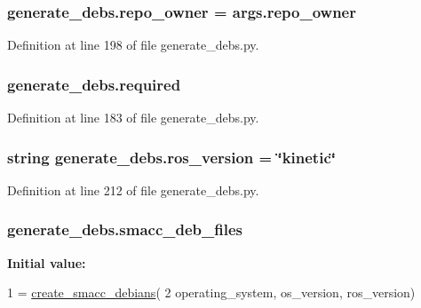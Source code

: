 \subsubsection[{\texorpdfstring{repo\+\_\+owner}{repo_owner}}]{\setlength{\rightskip}{0pt plus 5cm}generate\+\_\+debs.\+repo\+\_\+owner = args.\+repo\+\_\+owner}\hypertarget{namespacegenerate__debs_a23479dba5af50c90f3346b04d441ab2b}{}\label{namespacegenerate__debs_a23479dba5af50c90f3346b04d441ab2b}


Definition at line 198 of file generate\+\_\+debs.\+py.

\subsubsection[{\texorpdfstring{required}{required}}]{\setlength{\rightskip}{0pt plus 5cm}generate\+\_\+debs.\+required}\hypertarget{namespacegenerate__debs_a0199b8275e1bb7cf8a3355b264a5e305}{}\label{namespacegenerate__debs_a0199b8275e1bb7cf8a3355b264a5e305}


Definition at line 183 of file generate\+\_\+debs.\+py.

\subsubsection[{\texorpdfstring{ros\+\_\+version}{ros_version}}]{\setlength{\rightskip}{0pt plus 5cm}string generate\+\_\+debs.\+ros\+\_\+version = \char`\"{}kinetic\char`\"{}}\hypertarget{namespacegenerate__debs_ab436d8146ee3697ac269d8398023fb37}{}\label{namespacegenerate__debs_ab436d8146ee3697ac269d8398023fb37}


Definition at line 212 of file generate\+\_\+debs.\+py.

\subsubsection[{\texorpdfstring{smacc\+\_\+deb\+\_\+files}{smacc_deb_files}}]{\setlength{\rightskip}{0pt plus 5cm}generate\+\_\+debs.\+smacc\+\_\+deb\+\_\+files}\hypertarget{namespacegenerate__debs_ab78bceb1d7beaba0f39c13322ca316d7}{}\label{namespacegenerate__debs_ab78bceb1d7beaba0f39c13322ca316d7}
{\bfseries Initial value\+:}
\begin{DoxyCode}
1 = \hyperlink{namespacegenerate__debs_ad2e4e864bf753dbb1ed9a58436739905}{create\_smacc\_debians}(
2         operating\_system, os\_version, ros\_version)
\end{DoxyCode}


